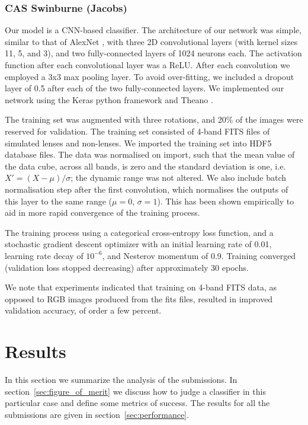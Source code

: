 \documentclass{aa}
\begin{document}
\subsubsection{CAS Swinburne (Jacobs)}
\label{sec:CASSwinburne}

Our model is a CNN-based classifier. The architecture of our network was simple, similar to that of AlexNet \citep{krizhevsky_imagenet_2012}, with three 2D convolutional layers (with kernel sizes 11, 5, and 3), and two fully-connected layers of 1024 neurons each. The activation function after each convolutional layer was a ReLU. After each convolution we employed a 3x3 max pooling layer. To avoid over-fitting, we included a dropout layer of 0.5 after each of the two fully-connected layers. We implemented our network using the Keras python framework \citep{Chollet_2015} and Theano \citep{Bastien_2012}.

The training set was augmented with three rotations, and 20\% of the images were reserved for validation. The training set consisted of 4-band FITS files of simulated lenses and non-lenses. We imported the training set into HDF5 database files. The data was normalised on import, such that the mean value of the data cube, across all bands, is zero and the standard deviation is one, i.e. \(X' = (X - \mu)/\sigma\); the dynamic range was not altered. We also include batch normalisation step after the first convolution, which normalises the outputs of this layer to the same range (\(\mu = 0\), \(\sigma = 1\)). This has been shown empirically to aid in more rapid convergence of the training process.

The training process using a categorical cross-entropy loss function, and a stochastic gradient descent optimizer with an initial learning rate of 0.01, learning rate decay of \(10^{-6}\), and Nesterov momentum \citep{nesterov83method} of 0.9. Training converged (validation loss stopped decreasing) after approximately 30 epochs.

We note that experiments indicated that training on 4-band FITS data, as opposed to RGB images produced from the fits files, resulted in improved validation accuracy, of order a few percent. 

\section{Results}
\label{sec:results}

In this section we summarize the analysis of the submissions.  In section~\ref{sec:figure_of_merit} we discuss how to judge a classifier in this particular case and define some metrics of success.  The results for all the submissions are given in section~\ref{sec:performance}.
\end{document}
